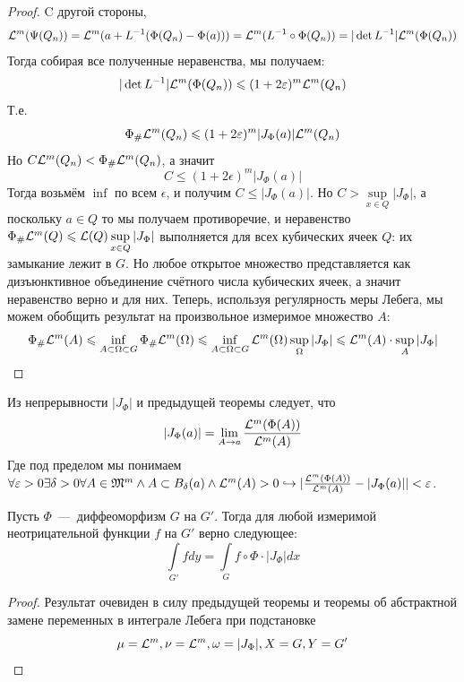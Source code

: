 \begin{proof}
    C другой стороны, \[\mathcal{L}^m(\Psi(Q_n)) = \mathcal{L}^m(a + L^{-1}(\Phi(Q_n) - \Phi(a))) = \mathcal{L}^m(L^{-1}\circ\Phi(Q_n)) = |\det L^{-1}| \mathcal{L}^m(\Phi(Q_n))\]
    Тогда собирая все полученные неравенства, мы получаем: \[|\det L^{-1}|\mathcal{L}^m(\Phi(Q_n)) \leqslant (1 + 2\varepsilon)^m \mathcal{L}^m(Q_n)\]
    Т.е. \[\Phi_\#\mathcal{L}^m(Q_n) \leqslant (1 + 2\varepsilon)^m|J_\Phi(a)|\mathcal{L}^m(Q_n)\]
    Но $C\mathcal{L}^m(Q_n) < \Phi_{\#}\mathcal{L}^m(Q_n)$, а значит \[C \leq (1 + 2\epsilon)^m|J_\Phi(a)|\]
    Тогда возьмём $\inf$ по всем $\epsilon$, и получим $C \leq |J_\Phi(a)|$. Но $C > \sup\limits_{x \in Q} |J_\Phi|$, а поскольку $a \in Q$ то мы получаем противоречие, и неравенство $\Phi_\#\mathcal{L}^m(Q) \leqslant \mathcal{L}(Q)\sup\limits_{x \in Q} |J_\Phi|$ выполняется для всех кубических ячеек $Q$: их замыкание лежит в $G$. Но любое открытое множество представляется как дизъюнктивное объединение счётного числа кубических ячеек, а значит неравенство верно и для них. Теперь, используя регулярность меры Лебега, мы можем обобщить результат на произвольное измеримое множество $A$: \[\Phi_\#\mathcal{L}^m(A) \leqslant \inf\limits_{A \subset \Omega \subset G} \Phi_\#\mathcal{L}^m(\Omega) \leqslant \inf\limits_{A \subset \Omega \subset G} \mathcal{L}^m(\Omega) \sup\limits_\Omega |J_\Phi| \leqslant \mathcal{L}^m(A) \cdot \sup\limits_A |J_\Phi|\]
\end{proof}
\begin{corollary}
    Из непрерывности $|J_\Phi|$ и предыдущей теоремы следует, что \[|J_\Phi(a)| = \lim\limits_{A \rightarrow a} \dfrac{\mathcal{L}^m(\Phi(A))}{\mathcal{L}^m(A)}\]
    Где под пределом мы понимаем $\forall \varepsilon > 0 \exists \delta > 0 \forall A \in \mathfrak{M}^m \wedge A \subset B_\delta(a) \wedge \mathcal{L}^m(A) > 0 \hookrightarrow |\frac{\mathcal{L}^m(\Phi(A))}{\mathcal{L}^m(A)} - |J_\Phi(a)|| < \varepsilon$.
\end{corollary}
\begin{theorem}
    Пусть $\Phi$~---~диффеоморфизм $G$ на $G'$. Тогда для любой измеримой неотрицательной функции $f$ на $G'$ верно следующее: \[\int\limits_{G'} fdy = \int\limits_G f \circ \Phi \cdot |J_\Phi|dx\]
\end{theorem}
\begin{proof}
    Результат очевиден в силу предыдущей теоремы и теоремы об абстрактной замене переменных в интеграле Лебега при подстановке \[\mu = \mathcal{L}^m, \nu = \mathcal{L}^m, \omega = |J_\Phi|, X = G, Y = G'\]
\end{proof}
